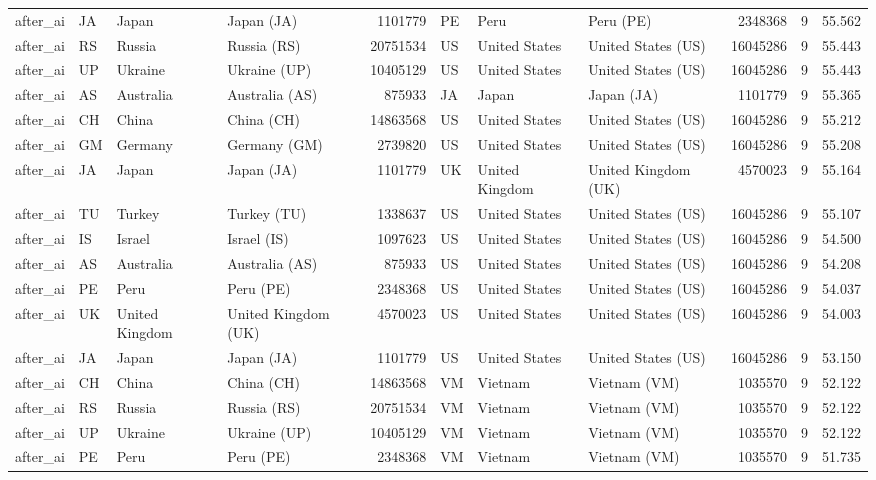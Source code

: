 \begin{tabular}{llllrlllrrr}
after\_ai & JA & Japan & Japan (JA) & 1101779 & PE & Peru & Peru (PE) & 2348368 & 9 & 55.562 \\
after\_ai & RS & Russia & Russia (RS) & 20751534 & US & United States & United States (US) & 16045286 & 9 & 55.443 \\
after\_ai & UP & Ukraine & Ukraine (UP) & 10405129 & US & United States & United States (US) & 16045286 & 9 & 55.443 \\
after\_ai & AS & Australia & Australia (AS) & 875933 & JA & Japan & Japan (JA) & 1101779 & 9 & 55.365 \\
after\_ai & CH & China & China (CH) & 14863568 & US & United States & United States (US) & 16045286 & 9 & 55.212 \\
after\_ai & GM & Germany & Germany (GM) & 2739820 & US & United States & United States (US) & 16045286 & 9 & 55.208 \\
after\_ai & JA & Japan & Japan (JA) & 1101779 & UK & United Kingdom & United Kingdom (UK) & 4570023 & 9 & 55.164 \\
after\_ai & TU & Turkey & Turkey (TU) & 1338637 & US & United States & United States (US) & 16045286 & 9 & 55.107 \\
after\_ai & IS & Israel & Israel (IS) & 1097623 & US & United States & United States (US) & 16045286 & 9 & 54.500 \\
after\_ai & AS & Australia & Australia (AS) & 875933 & US & United States & United States (US) & 16045286 & 9 & 54.208 \\
after\_ai & PE & Peru & Peru (PE) & 2348368 & US & United States & United States (US) & 16045286 & 9 & 54.037 \\
after\_ai & UK & United Kingdom & United Kingdom (UK) & 4570023 & US & United States & United States (US) & 16045286 & 9 & 54.003 \\
after\_ai & JA & Japan & Japan (JA) & 1101779 & US & United States & United States (US) & 16045286 & 9 & 53.150 \\
after\_ai & CH & China & China (CH) & 14863568 & VM & Vietnam & Vietnam (VM) & 1035570 & 9 & 52.122 \\
after\_ai & RS & Russia & Russia (RS) & 20751534 & VM & Vietnam & Vietnam (VM) & 1035570 & 9 & 52.122 \\
after\_ai & UP & Ukraine & Ukraine (UP) & 10405129 & VM & Vietnam & Vietnam (VM) & 1035570 & 9 & 52.122 \\
after\_ai & PE & Peru & Peru (PE) & 2348368 & VM & Vietnam & Vietnam (VM) & 1035570 & 9 & 51.735 \\

\end{tabular}
